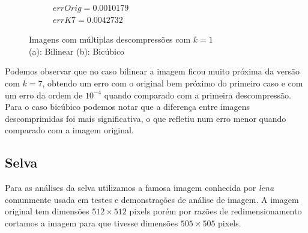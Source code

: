 \documentclass[12pt, a4paper]{article}
\begin{document}
\begin{figure}[h!]
\begin{center}
\begin{subfigure}{.3\textwidth}
            \caption{$errOrig = 0.0010179$ \\ $errK7 = 0.0042732$}
        \end{subfigure}
        \end{center}
        \caption{Imagens com múltiplas descompressões com $k=1$ \\
                        (a): Bilinear \; (b): Bicúbico}
    \end{figure}
    \newpage

    Podemos observar que no caso bilinear a imagem ficou muito próxima da versão
    com $k=7$, obtendo um erro com o original bem próximo do primeiro caso e com
    um erro da ordem de $10^{-4}$ quando comparado com a primeira descompressão.\\
    Para o caso bicúbico podemos notar que a diferença entre imagens descomprimidas
    foi mais significativa, o que refletiu num erro menor quando comparado com a
    imagem original.

\vspace{1cm}
\subsection*{Selva}
    Para as análises da selva utilizamos a famosa imagem conhecida por \emph{lena}
    comunmente usada em testes e demonstrações de análise de imagem. A imagem original
    tem dimensões $512 \times 512$ pixels porém por razões de redimensionamento
    cortamos a imagem para que tivesse dimensões $505 \times 505$ pixels.
\end{document}
